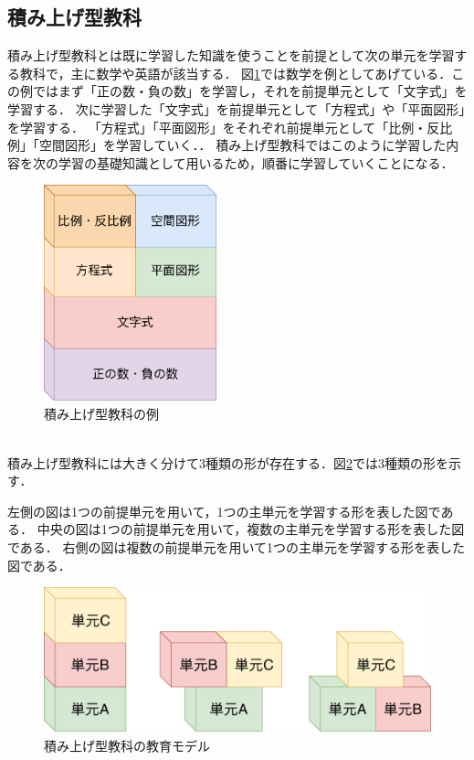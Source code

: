 \documentclass[a4j,12pt]{jsarticle}
\begin{document}
\subsection{積み上げ型教科}
積み上げ型教科とは既に学習した知識を使うことを前提として次の単元を学習する教科で，主に数学や英語が該当する．
図\ref{fig:04}では数学を例としてあげている．この例ではまず「正の数・負の数」を学習し，それを前提単元として「文字式」を学習する．
次に学習した「文字式」を前提単元として「方程式」や「平面図形」を学習する．
「方程式」「平面図形」をそれぞれ前提単元として「比例・反比例」「空間図形」を学習していく．．
積み上げ型教科ではこのように学習した内容を次の学習の基礎知識として用いるため，順番に学習していくことになる．\\

\begin{figure}[H]
\centering
\includegraphics[width=5cm]{04.pdf}
\caption{積み上げ型教科の例}
\label{fig:04}
\end{figure} 
\ \\
積み上げ型教科には大きく分けて3種類の形が存在する．図\ref{fig:03}では3種類の形を示す．

左側の図は1つの前提単元を用いて，1つの主単元を学習する形を表した図である．
中央の図は1つの前提単元を用いて，複数の主単元を学習する形を表した図である．
右側の図は複数の前提単元を用いて1つの主単元を学習する形を表した図である．
\begin{figure}[H]
\centering
\includegraphics[width=12cm]{03.pdf}
\caption{積み上げ型教科の教育モデル}
\label{fig:03}
\end{figure} 
\end{document}
